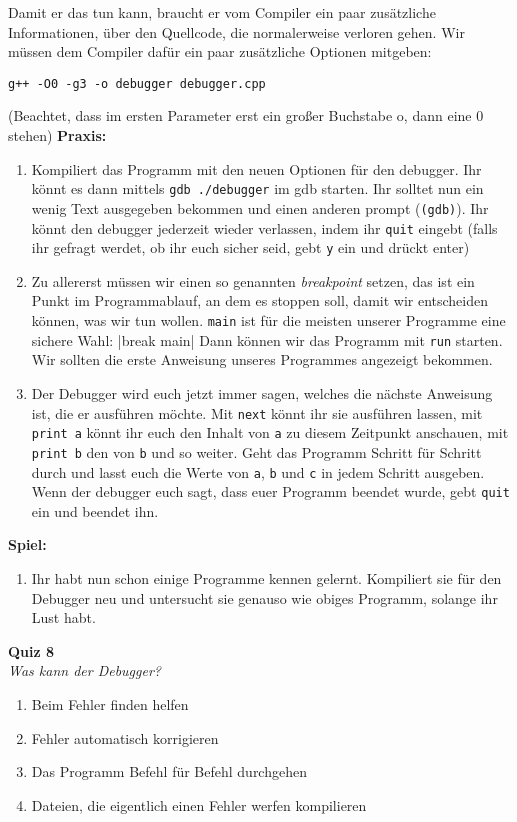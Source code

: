 Damit er das tun kann, braucht er vom Compiler ein paar zusätzliche
Informationen, über den Quellcode, die normalerweise verloren gehen. Wir müssen
dem Compiler dafür ein paar zusätzliche Optionen mitgeben:
\begin{verbatim}
g++ -O0 -g3 -o debugger debugger.cpp
\end{verbatim}
(Beachtet, dass im ersten Parameter erst ein großer Buchstabe o, dann eine 0 stehen)
\textbf{Praxis:}
\begin{enumerate}
    \item Kompiliert das Programm mit den neuen Optionen für den debugger. Ihr
        könnt es dann mittels \verb|gdb ./debugger| im gdb starten. Ihr solltet
        nun ein wenig Text ausgegeben bekommen und einen anderen prompt
        (\texttt{(gdb)}). Ihr könnt den debugger jederzeit wieder verlassen,
        indem ihr \texttt{quit} eingebt (falls ihr gefragt werdet, ob ihr euch
        sicher seid, gebt \texttt{y} ein und drückt enter)
    \item Zu allererst müssen wir einen so genannten \emph{breakpoint} setzen,
        das ist ein Punkt im Programmablauf, an dem es stoppen soll, damit wir
        entscheiden können, was wir tun wollen. \texttt{main} ist für die
        meisten unserer Programme eine sichere Wahl:
        |break main|
        Dann können wir das Programm mit \texttt{run} starten. Wir sollten die
        erste Anweisung unseres Programmes angezeigt bekommen.
    \item Der Debugger wird euch jetzt immer sagen, welches die nächste
        Anweisung ist, die er ausführen möchte. Mit \texttt{next} könnt ihr sie
        ausführen lassen, mit \texttt{print a} könnt ihr euch den Inhalt von
        \texttt{a} zu diesem Zeitpunkt anschauen, mit \texttt{print b} den von
        \texttt{b} und so weiter. Geht das Programm Schritt für Schritt durch
        und lasst euch die Werte von \texttt{a}, \texttt{b} und \texttt{c} in
        jedem Schritt ausgeben. Wenn der debugger euch sagt, dass euer Programm
        beendet wurde, gebt \texttt{quit} ein und beendet ihn.
\end{enumerate}

\textbf{Spiel:}
\begin{enumerate}
    \item Ihr habt nun schon einige Programme kennen gelernt. Kompiliert sie
        für den Debugger neu und untersucht sie genauso wie obiges Programm,
        solange ihr Lust habt.
\end{enumerate}

\textbf{Quiz 8}\\
\textit{Was kann der Debugger?}
\begin{enumerate}[label=\alph]
    \item Beim Fehler finden helfen
    \item Fehler automatisch korrigieren
    \item Das Programm Befehl für Befehl durchgehen
    \item Dateien, die eigentlich einen Fehler werfen kompilieren
\end{enumerate}
